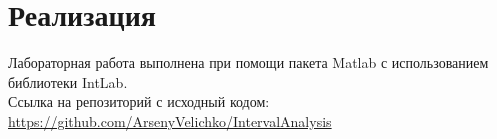 \section{Реализация}
Лабораторная работа выполнена при помощи пакета Matlab с использованием библиотеки IntLab.\\
Ссылка на репозиторий с исходный кодом:\\
\url{https://github.com/ArsenyVelichko/IntervalAnalysis}
